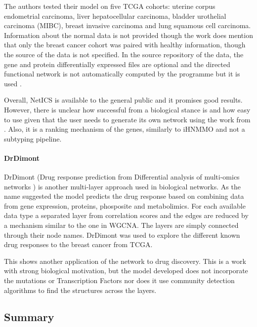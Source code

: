 The authors tested their model on five TCGA cohorts: uterine corpus endometrial carcinoma, liver hepatocellular carcinoma, bladder urothelial carcinoma (MIBC), breast invasive carcinoma and lung squamous cell carcinoma. Information about the normal data is not provided though the work does mention that only the breast cancer cohort was paired with healthy information, though the source of the data is not specified. In the source repository of the data, the gene and protein differentially expressed files are optional and the directed functional network is not automatically computed by the programme but it is used \citet{Wu2010-ap}.

Overall, NetICS is available to the general public and it promises good results. However, there is unclear how successful from a biological stance is and how easy to use given that the user needs to generate its own network using the work from \citet{Wu2010-ap}. Also, it is a ranking mechanism of the genes, similarly to iHNMMO and not a subtyping pipeline.



\paragraph*{DrDimont} \label{s:lit:drDimont}

DrDimont (Drug response prediction from Differential analysis of multi-omics networks \citet{Hiort2022-lk}) is another multi-layer approach used in biological networks. As the name suggested the model predicts the drug response based on combining data from gene expression, proteins, phosposite and metabolimics. For each available data type a separated layer from correlation scores and the edges are reduced by a mechanism similar to the one in WGCNA. The layers are simply connected through their node names. DrDimont was used to explore the different known drug responses to the breast cancer from TCGA.

This shows another application of the network to drug discovery. This is a work with strong biological motivation, but the model developed does not incorporate the mutations or Transcription Factors nor does it use community detection algorithms to find the structures across the layers.

\subsection{Summary}


